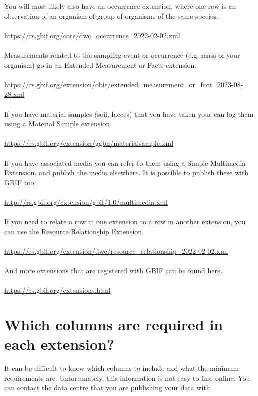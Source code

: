\documentclass[a4paper,english, 11pt]{article}
\begin{document}
You will most likely also have an occurrence extension, where one row is an observation of an organism of group of organisms of the same species.
\\
\\
\url{https://rs.gbif.org/core/dwc_occurrence_2022-02-02.xml}
\\
\\
Measurements related to the sampling event or occurrence (e.g. mass of your organism) go in an Extended Measurement or Facts extension.
\\
\\
\url{https://rs.gbif.org/extension/obis/extended_measurement_or_fact_2023-08-28.xml}
\\
\\
If you have material samples (soil, faeces) that you have taken your can log them using a Material Sample extension.
\\
\\
\url{https://rs.gbif.org/extension/ggbn/materialsample.xml}
\\
\\
If you have associated media you can refer to them using a Simple Multimedia Extension, and publish the media elsewhere. It is possible to publish these with GBIF too.
\\
\\
\url{http://rs.gbif.org/extension/gbif/1.0/multimedia.xml}
\\
\\
If you need to relate a row in one extension to a row in another extension, you can use the Resource Relationship Extension.
\\
\\
\url{https://rs.gbif.org/extension/dwc/resource_relationship_2022-02-02.xml}
\\
\\
And more extensions that are registered with GBIF can be found here.
\\
\\
\url{https://rs.gbif.org/extensions.html}

\section{Which columns are required in each extension?}
\label{s:required_columns}

It can be difficult to know which columns to include and what the minimum requirements are. Unfortunately, this information is not easy to find online. You can contact the data centre that you are publishing your data with.
\end{document}
